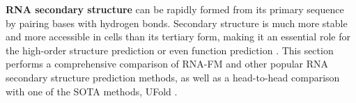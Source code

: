 
\textbf{RNA secondary structure} can be rapidly formed from its primary sequence by pairing bases with hydrogen bonds. Secondary structure is much more stable and more accessible in cells than its tertiary form, making it an essential role for the high-order structure prediction or even function prediction \cite{zhao2021review}. This section performs a comprehensive comparison of RNA-FM and other popular RNA secondary structure prediction methods, as well as a head-to-head comparison with one of the SOTA methods, UFold \cite{fu2021ufold}.

